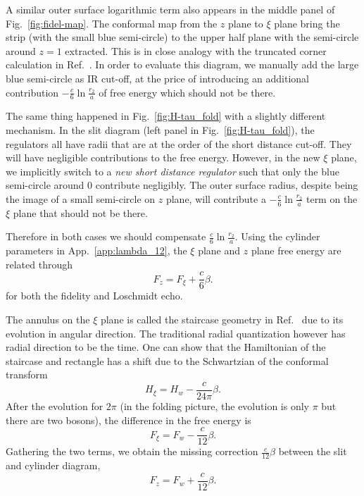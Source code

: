 A similar outer surface logarithmic term also appears in the middle panel of Fig.~\ref{fig:fidel-map}. The conformal map from the $z$ plane to $\xi$ plane bring the strip (with the small blue semi-circle) to the upper half plane with the semi-circle around $z = 1$ extracted. This is in close analogy with the truncated corner calculation in Ref.~. In order to evaluate this diagram, we manually add the large blue semi-circle as IR cut-off, at the price of introducing an additional contribution  $-\frac{c}{6} \ln \frac{r_2}{a}$ of free energy which should not be there. 

The same thing happened in Fig.~\ref{fig:H-tau_fold} with a slightly different mechanism. In the slit diagram (left panel in Fig.~\ref{fig:H-tau_fold}), the regulators all have radii that are at the order of the short distance cut-off. They will have negligible contributions to the free energy. However, in the new $\xi$ plane, we implicitly switch to a {\it new short distance regulator} such that only the blue semi-circle around $0$ contribute negligibly. The outer surface radius, despite being the image of a small semi-circle on $z$ plane, will contribute a $-\frac{c}{6} \ln \frac{r_2}{a}$ term on the $\xi$ plane that should not be there. 

Therefore in both cases we should compensate $\frac{c}{6} \ln \frac{r_2}{a}$. Using the cylinder parameters in App.~\ref{app:lambda_12}, the $\xi$ plane and $z$ plane free energy are related through
\begin{equation}
F_{z} = F_{\xi} + \frac{c}{6} \beta .
\end{equation}
for both the fidelity and Loschmidt echo. 

The annulus on the $\xi$ plane is called the staircase geometry in Ref.~ due to its evolution in angular direction. The traditional radial quantization however has radial direction to be the time. One can show that the Hamiltonian of the staircase and rectangle has a shift due to the Schwartzian\cite{cardy_finite-size_1988} of the conformal transform
\begin{equation}
H_{\xi} = H_{w} - \frac{c}{24\pi} \beta .
\end{equation}
After the evolution for $2\pi$ (in the folding picture, the evolution is only $\pi$ but there are two bosons), the difference in the free energy is
\begin{equation}
F_{\xi} = F_{w} - \frac{c}{12} \beta .
\end{equation}
Gathering the two terms, we obtain the missing correction $\frac{c}{12} \beta$ between the slit and cylinder diagram, 
\begin{equation}
F_{z} = F_w + \frac{c}{12}\beta.
\end{equation}


